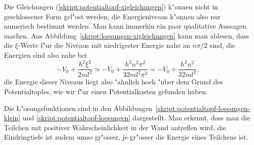Die Gleichungen (\ref{skript:potentialtopf-xigleichungen}) k"onnen nicht 
in geschlossener Form gel"ost werden, die Energieniveaus k"onnen also
nur numerisch bestimmt werden.
Man kann immerhin ein paar qualitative Aussagen machen.
Aus Abbildung~\ref{skript:loesungen-xigleichungen} kann man ablesen, dass die
$\xi$-Werte f"ur die Niveaus mit niedrigester Energie nahe an $n\pi/2$
sind, die Energien sind also nahe bei
\[
-V_0+\frac{\hbar^2\xi^2}{2ml^2}
\simeq
-V_0+\frac{h^2n^2\pi^2}{32ml^2\pi^2}
=
-V_0+\frac{h^2n^2}{32ml^2},
\]
die Energie dieser Niveaus liegt also "ahnlich hoch "uber dem Grund
des Potentialtopfes, wie wir f"ur einen Potentialkasten gefunden haben.

Die L"osungsfunktionen sind in den
Abbildungen~\ref{skript:potentialtopf-loesungen-klein}
und \ref{skript:potentialtopf-loesungen}
dargestellt.
Man erkennt, dass man die Teilchen mit positiver Wahrscheinlichkeit in
der Wand antreffen wird, die Eindringtiefe ist zudem umso gr"osser,
je gr"osser die Energie eines Teilchens ist.
